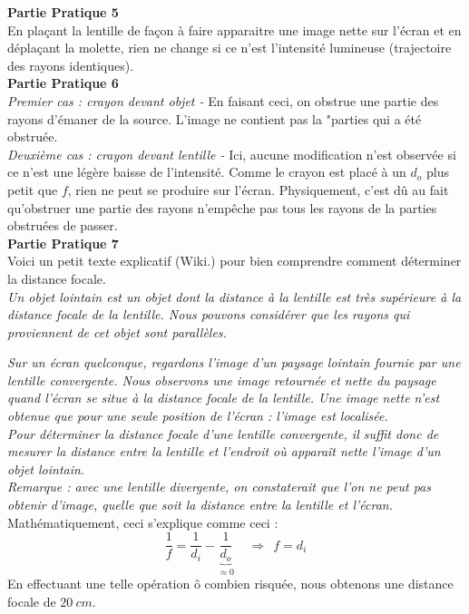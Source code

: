 \documentclass	[11pt, a4paper, openany]{book}
\begin{document}
\textbf{Partie Pratique 5}\\
En plaçant la lentille de façon à faire apparaitre une image nette sur l'écran et en déplaçant la molette, rien ne change si ce n'est l'intensité lumineuse (trajectoire des rayons identiques).\\

\textbf{Partie Pratique 6}\\
\textit{Premier cas : crayon devant objet -} En faisant ceci, on obstrue une partie des rayons d'émaner de la source. L'image ne contient pas la "parties qui a été obstruée.\\

\textit{Deuxième cas : crayon devant lentille -} Ici, aucune modification n'est observée si ce n'est une légère baisse de l'intensité. Comme le crayon est placé à un $d_o$ plus petit que $f$, rien ne peut se produire sur l'écran. Physiquement, c'est dû au fait qu'obstruer une partie des rayons n'empêche pas tous les rayons de la parties obstruées de passer.\\

\textbf{Partie Pratique 7}\\
Voici un petit texte explicatif (Wiki.) pour bien comprendre comment déterminer la distance focale.\\

\textit{Un objet lointain est un objet dont la distance à la lentille est très supérieure à la distance focale de la lentille. Nous pouvons considérer que les rayons qui proviennent de cet objet sont parallèles.}

\textit{Sur un écran quelconque, regardons l'image d'un paysage lointain fournie par une lentille convergente. Nous observons une image retournée et nette du paysage quand l'écran se situe à la distance focale de la lentille. Une image nette n'est obtenue que pour une seule position de l'écran : l'image est localisée.}\\

\textit{Pour déterminer la distance focale d'une lentille convergente, il suffit donc de mesurer la distance entre la lentille et l'endroit où apparaît nette l'image d'un objet lointain.}\\

\textit{Remarque : avec une lentille divergente, on constaterait que l'on ne peut pas obtenir d'image, quelle que soit la distance entre la lentille et l'écran.}\\

Mathématiquement, ceci s'explique comme ceci :
\begin{equation}
\frac{1}{f} = \frac{1}{d_i} - \underbrace{\frac{1}{d_o}}_{\approx 0}\ \ \ \ \ \Rightarrow \ \ f = d_i
\end{equation}
En effectuant une telle opération ô combien risquée, nous obtenons une distance focale de $20\ cm$.\\
\end{document}
